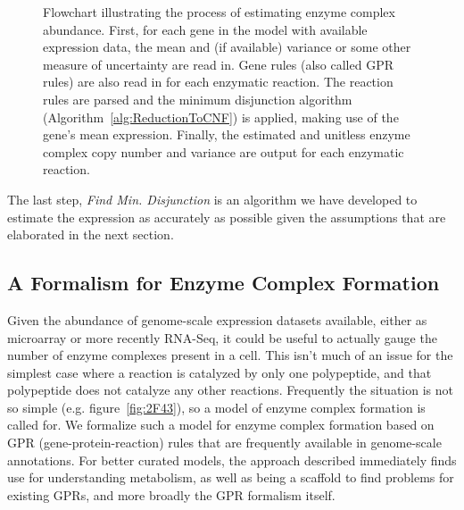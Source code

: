 \vspace{5 mm} 
\begin{figure}
\begin{center}
\end{center}
\caption{Flowchart illustrating the process of estimating enzyme
  complex abundance. First, for each gene in the model with
  available expression data, the mean and (if available) variance or
  some other measure of uncertainty are read in. Gene rules (also
  called GPR rules) are also read in for each enzymatic reaction. The
  reaction rules are parsed and the minimum disjunction algorithm
  (Algorithm~\ref{alg:ReductionToCNF}) is applied, making use of the
  gene's mean expression. Finally, the estimated and unitless enzyme
  complex copy number and variance are output for each enzymatic
  reaction.}
\label{ECCN_flowchart}
\end{figure}

The last step, \emph{Find Min. Disjunction} is an algorithm we have
developed to estimate the expression as accurately as possible given
the assumptions that are elaborated in the next section.

\subsection{A Formalism for Enzyme Complex Formation}

Given the abundance of genome-scale expression datasets available,
either as microarray or more recently RNA-Seq, it could be useful to
actually gauge the number of enzyme complexes present in a cell. This
isn't much of an issue for the simplest case where a reaction is
catalyzed by only one polypeptide, and that polypeptide does not
catalyze any other reactions.  Frequently the situation is not so
simple (e.g. figure~\ref{fig:2F43}), so a model of enzyme complex
formation is called for.  We formalize such a model for enzyme complex
formation based on GPR (gene-protein-reaction) rules that are
frequently available in genome-scale annotations. For better curated
models, the approach described immediately finds use for understanding
metabolism, as well as being a scaffold to find problems for existing
GPRs, and more broadly the GPR formalism itself.

